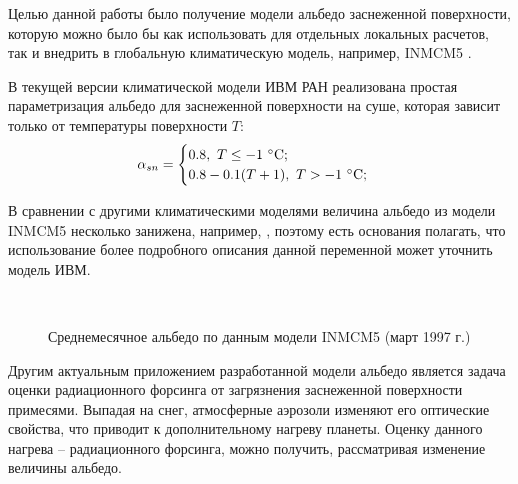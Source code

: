 \documentclass[a4paper, fontsize=14pt]{scrartcl}
\begin{document}
Целью данной работы было получение модели альбедо заснеженной поверхности, которую можно было бы как использовать для отдельных локальных расчетов, так и внедрить в глобальную климатическую модель, например, INMCM5 \cite{Volodin2017rus}.  

В текущей версии климатической модели ИВМ РАН реализована простая параметризация альбедо для заснеженной поверхности на суше, которая зависит только от температуры поверхности $T$: 
\begin{equation}
    \alpha_{sn} = \begin{cases}
                        0.8,~ T \leq -1 ~\degree \mathrm{C}; \\
                        0.8 - 0.1(T + 1), ~T > -1 ~\degree \mathrm{C};
                  \end{cases} \label{sysAlbOld}
\end{equation}

В сравнении с другими климатическими моделями величина альбедо из модели INMCM5 несколько занижена, например, \cite{Flanner2007, Gueymard2019}, поэтому есть основания полагать, что использование более подробного описания данной переменной может уточнить модель ИВМ. \sloppy 

\begin{figure}[h]
    \\
    \caption{Среднемесячное альбедо по данным модели INMCM5 (март 1997 г.) \sloppy }
    \label{fig:imageAlbOld}
\end{figure}


Другим актуальным приложением разработанной модели альбедо является задача оценки радиационного форсинга от загрязнения заснеженной поверхности примесями. Выпадая на снег, атмосферные аэрозоли изменяют его оптические свойства, что приводит к дополнительному нагреву планеты. Оценку данного нагрева -- радиационного форсинга, можно получить, рассматривая изменение величины альбедо. \sloppy 
\end{document}

